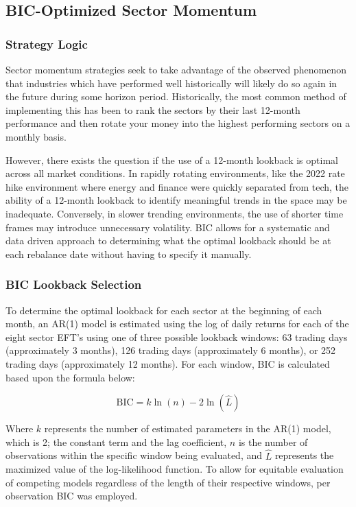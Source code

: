 \documentclass[12pt]{article}
\begin{document}
\subsection{BIC-Optimized Sector Momentum}

\subsubsection{Strategy Logic}

Sector momentum strategies seek to take advantage of the observed phenomenon that industries which have performed well historically will likely do so again in the future during some horizon period. Historically, the most common method of implementing this has been to rank the sectors by their last 12-month performance and then rotate your money into the highest performing sectors on a monthly basis.

However, there exists the question if the use of a 12-month lookback is optimal across all market conditions. In rapidly rotating environments, like the 2022 rate hike environment where energy and finance were quickly separated from tech, the ability of a 12-month lookback to identify meaningful trends in the space may be inadequate. Conversely, in slower trending environments, the use of shorter time frames may introduce unnecessary volatility. BIC allows for a systematic and data driven approach to determining what the optimal lookback should be at each rebalance date without having to specify it manually.

\subsubsection{BIC Lookback Selection}

To determine the optimal lookback for each sector at the beginning of each month, an AR(1) model is estimated using the log of daily returns for each of the eight sector EFT's using one of three possible lookback windows: 63 trading days (approximately 3 months), 126 trading days (approximately 6 months), or 252 trading days (approximately 12 months). For each window, BIC is calculated based upon the formula below:

\begin{equation}
\text{BIC} = k \ln(n) - 2\ln(\hat{L})
\end{equation}

Where $k$ represents the number of estimated parameters in the AR(1) model, which is 2; the constant term and the lag coefficient, $n$ is the number of observations within the specific window being evaluated, and $\hat{L}$ represents the maximized value of the log-likelihood function. To allow for equitable evaluation of competing models regardless of the length of their respective windows, per observation BIC was employed.
\end{document}
